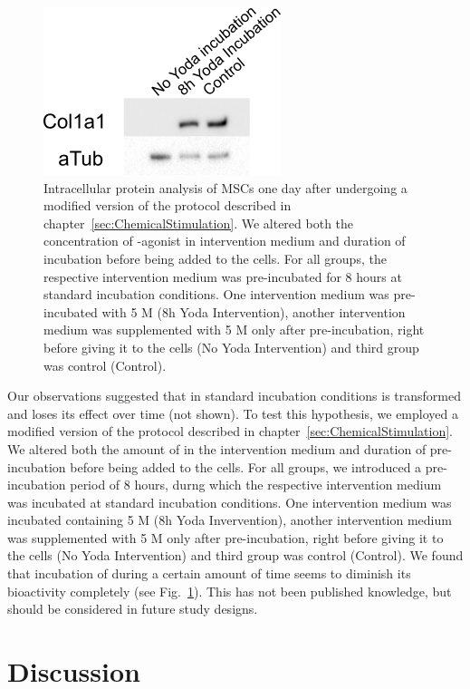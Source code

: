 \begin{figure}
	\centering
	\includegraphics[width = 0.4\linewidth{}]{Inkubationshypothese.png}
	\caption{Intracellular protein analysis of MSCs one day after undergoing a modified version of the protocol described in chapter~\ref{sec:ChemicalStimulation}. We altered both the concentration of \Piezo{}-agonist \Yoda{} in intervention medium and duration of \Yoda{} incubation before being added to the cells. For all groups, the respective intervention medium was pre-incubated for 8 hours at standard incubation conditions. One intervention medium was pre-incubated with 5 \textmu{}M \Yoda{} (8h Yoda Intervention), another intervention medium was supplemented with 5 \textmu{}M \Yoda{} only after pre-incubation, right before giving it to the cells (No Yoda Intervention) and third group was \Yoda{} control (Control).}
	\label{fig:Inkubationshypothese_Western}
\end{figure}

Our observations suggested that in standard incubation conditions \Yoda{} is transformed and loses its effect over time (not shown). To test this hypothesis, we employed a modified version of the protocol described in chapter~\ref{sec:ChemicalStimulation}. We altered both the amount of \Yoda{} in the intervention medium and duration of \Yoda{} pre-incubation before being added to the cells. For all groups, we introduced a pre-incubation period of 8 hours, durng which the respective intervention medium was incubated at standard incubation conditions. One intervention medium was incubated containing 5 \mul{}M \Yoda{} (8h Yoda Invervention), another intervention medium was supplemented with 5 \mul{}M \Yoda{} only after pre-incubation, right before giving it to the cells (No Yoda Intervention) and third group was \Yoda{} control (Control). We found that incubation of \Yoda{} during a certain amount of time seems to diminish its bioactivity completely (see Fig.~\ref{fig:Inkubationshypothese_Western}). This has not been published knowledge, but should be considered in future study designs.

\chapter{Discussion}

